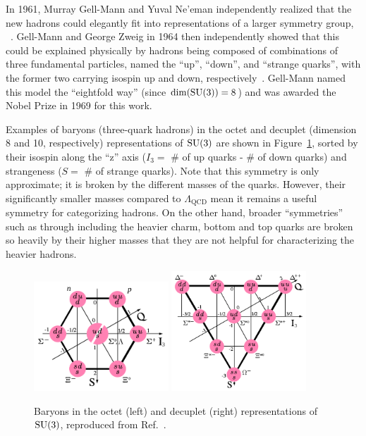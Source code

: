 In 1961, Murray Gell-Mann and Yuval Ne'eman independently realized that the new hadrons could elegantly fit into representations of a larger symmetry group, \SU[3]~\cite{Gell-Mann:1961omu, Neeman:1961jhl}.
Gell-Mann and George Zweig in 1964 then independently showed that this could be explained physically by hadrons being composed of combinations of three fundamental particles, named the ``up'', ``down'', and ``strange quarks'', with the former two carrying isospin up and down, respectively~\cite{Gell-Mann:1964ewy, Zweig:1964jf}.
Gell-Mann named this model the ``eightfold way'' (since $\dim (\SU[3]) = 8$) and was awarded the Nobel Prize in 1969 for this work.

Examples of baryons (three-quark hadrons) in the octet and decuplet (dimension 8 and 10, respectively) representations of $\SU[3]$ are shown in Figure~\ref{fig:01_sm_qcd_eightfoldway}, sorted by their isospin along the ``z'' axis ($I_3 = $ \# of up quarks - \# of down quarks) and strangeness ($S = $ \# of strange quarks).
Note that this \SU[3] symmetry is only approximate; it is broken by the different masses of the quarks.
However, their significantly smaller masses compared to $\Lambda_\mathrm{QCD}$ mean it remains a useful symmetry for categorizing hadrons.
On the other hand, broader ``symmetries'' such as \SU[4] through \SU[6] including the heavier charm, bottom and top quarks are broken so heavily by their higher masses that they are not helpful for characterizing the heavier hadrons.

\begin{figure}[ht]
	\centering
	\includegraphics[width=0.45\textwidth]{figures/01-SM-03-SM/qcd/Baryon-octet-small.svg.png}
	\includegraphics[width=0.45\textwidth]{figures/01-SM-03-SM/qcd/Baryon-decuplet-small.svg.png}
	\caption{Baryons in the octet (left) and decuplet (right) representations of $\SU[3]$, reproduced from Ref.~\cite{enwiki:1243626239}.}
	\label{fig:01_sm_qcd_eightfoldway}
\end{figure}

